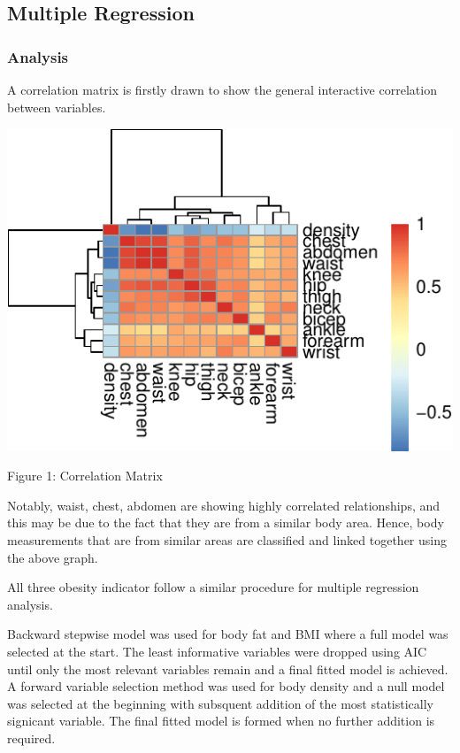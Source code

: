 \documentclass[a4paper,9pt,twocolumn,twoside,]{pinp}
\begin{document}
\hypertarget{multiple-regression}{%
\subsection{Multiple Regression}\label{multiple-regression}}

\hypertarget{analysis-1}{%
\subsubsection{Analysis}\label{analysis-1}}

A correlation matrix is firstly drawn to show the general interactive
correlation between variables.

\begin{center}\includegraphics{Executive_Report_files/figure-latex/unnamed-chunk-1-1} \end{center}

Figure 1: Correlation Matrix

Notably, waist, chest, abdomen are showing highly correlated
relationships, and this may be due to the fact that they are from a
similar body area. Hence, body measurements that are from similar areas
are classified and linked together using the above graph.

All three obesity indicator follow a similar procedure for multiple
regression analysis.

Backward stepwise model was used for body fat and BMI where a full model
was selected at the start. The least informative variables were dropped
using AIC until only the most relevant variables remain and a final
fitted model is achieved. A forward variable selection method was used
for body density and a null model was selected at the beginning with
subsquent addition of the most statistically signicant variable. The
final fitted model is formed when no further addition is required.
\end{document}
